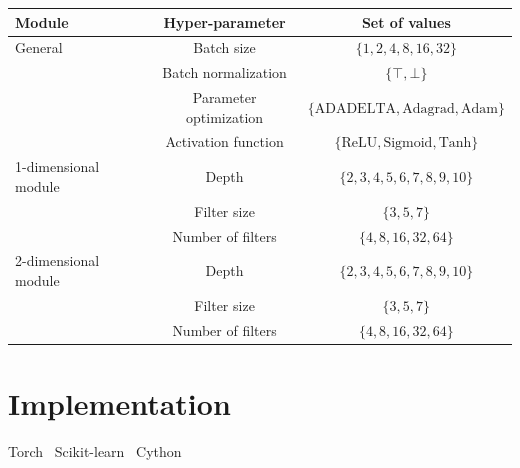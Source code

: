 
  \begin{table}[H]
    \centering
    \begin{tabular}{|l|c|c|}
      \hline
      Module & Hyper-parameter & Set of values \\
      \hline
      \hline
      General & Batch size & $\{ 1, 2, 4, 8, 16, 32 \}$ \\
              & Batch normalization & $\{ \top, \bot \}$ \\
              & Parameter optimization & $\{ \text{ADADELTA}, \text{Adagrad}, \text{Adam} \}$ \\
              & Activation function & $\{ \text{ReLU}, \text{Sigmoid}, \text{Tanh} \}$ \\
      \hline
      1-dimensional module & Depth & $\{ 2, 3, 4, 5, 6, 7, 8, 9, 10 \}$ \\
                           & Filter size & $\{ 3, 5, 7 \}$ \\
                           & Number of filters & $\{ 4, 8, 16, 32, 64 \}$ \\
      \hline
      2-dimensional module & Depth & $\{ 2, 3, 4, 5, 6, 7, 8, 9, 10 \}$ \\
                           & Filter size & $\{ 3, 5, 7 \}$ \\
                           & Number of filters & $\{ 4, 8, 16, 32, 64 \}$ \\
      \hline
    \end{tabular}
    \label{hyperparams}
  \end{table}

\section{Implementation}

  Torch~\cite{torch}
  Scikit-learn~\cite{scikit-learn}
  Cython~\cite{behnel2010cython}